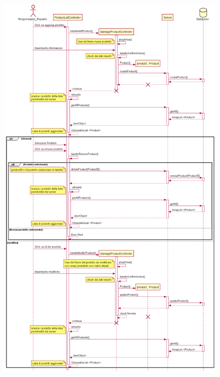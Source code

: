 \documentclass[12pt, a4paper]{report}
\begin{document}
\begin{figure}[H]
  \centering
  \includegraphics[width=\textwidth]{sequence_gestione_prodotto.png}

\end{figure}
\end{document}
